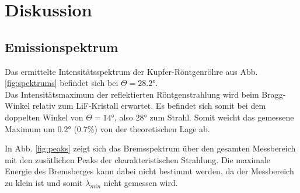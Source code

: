 \newpage
\section{Diskussion}
\subsection{Emissionspektrum}
Das ermittelte Intensitätsspektrum der Kupfer-Röntgenröhre aus Abb. \ref{fig:spektrums}
befindet sich bei $\Theta=28.2°$.\\
Das Intensitätsmaximum der reflektierten Röntgenstrahlung wird beim Bragg-Winkel relativ
zum LiF-Kristall erwartet. Es befindet sich somit bei dem doppelten Winkel von $\Theta=14°$, also $28$° 
zum Strahl. Somit weicht das gemessene Maximum um $0.2°$ (0.7\%) von der theoretischen Lage ab.



In Abb. \ref{fig:peaks} zeigt sich das Bremsspektrum über den gesamten Messbereich mit
den zusätlichen Peaks der charakteristischen Strahlung. Die maximale Energie des Bremsberges
kann dabei nicht bestimmt werden, da der Messbereich zu klein ist und somit  $\lambda_{min}$ nicht 
gemessen wird.

